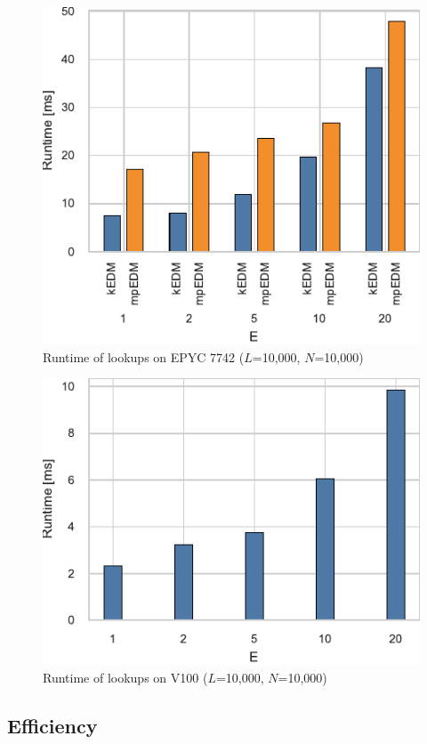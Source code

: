 \documentclass[conference]{IEEEtran}
\begin{document}
\begin{figure}
    \centering
    \includegraphics{figs/runtime_lookup_epyc}
    \caption{Runtime of lookups on EPYC 7742 ($L$=10,000, $N$=10,000)}%
    \label{fig:breakdown-lookup-epyc}
\end{figure}

\begin{figure}
    \centering
    \includegraphics{figs/runtime_lookup_v100}
    \caption{Runtime of lookups on V100 ($L$=10,000, $N$=10,000)}%
    \label{fig:breakdown-lookup-v100}
\end{figure}

\subsection{Efficiency}
\end{document}
